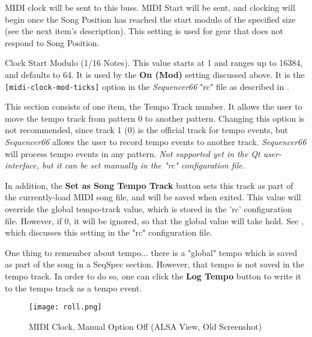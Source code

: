    MIDI clock will be sent to this buss.
   MIDI Start will be sent, and clocking will begin
   once the Song Position has reached the start modulo of the specified size
   (see the next item's description).
   This setting is used for gear that does not respond to Song Position.

   Clock Start Modulo (1/16 Notes).
   This value starts at 1 and ranges up to 16384, and defaults to 64.
   It is used by the \textbf{On (Mod)} setting discussed above.
   It is the \texttt{[midi-clock-mod-ticks]} option in the \textsl{Sequencer66}
   "rc" file as described in
   .

   This section consists of one item, the Tempo Track number.
   It allows the user to move the tempo track from pattern 0 to
   another pattern.  Changing this option is not recommended, since track 1 (0)
   is the official track for tempo events, but \textsl{Sequencer66} allows the
   user to record tempo events to another track.  \textsl{Sequencer66} will
   process tempo events in any pattern.
   \textsl{Not supported yet in the Qt user-interface, but
   it can be set manually in the "rc" configuration file.}

   In addition, the \textbf{Set as Song Tempo Track} button sets this
   track as part of the currently-load MIDI song file, and will be saved when
   exited.  This value will override the global tempo-track value, which is
   stored in the 'rc' configuration file.  However, if 0, it will be ignored,
   so that the global value will take hold.
   See , which discusses this
   setting in the "rc" configuration file.

   One thing to remember about tempo...
   there is a "global" tempo which is saved as part of the song in a SeqSpec
   section.  However, that tempo is not saved in the tempo track.
   In order to do so, one can click the \textbf{Log Tempo} button to write it
   to the tempo track as a tempo event.

\begin{figure}[H]
   \centering 
   \texttt{[image: roll.png]}
   \caption{MIDI Clock, Manual Option Off (ALSA View, Old Screenshot)}
   \label{fig:seq66_midi_clock_4_devices_manual_0}
\end{figure}

